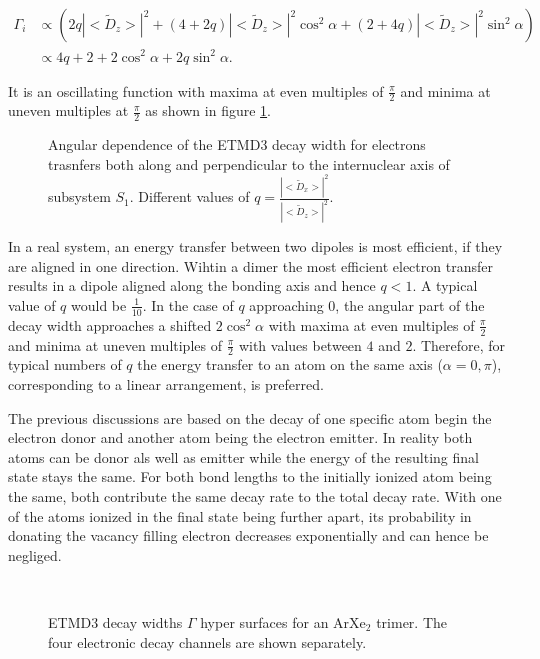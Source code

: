 \begin{align}
 \Gamma_i &\propto \left( 2q |<\tilde{D}_{z}>|^2 +
                  (4+2q)|<\tilde{D}_{z}>|^2 \cos^2\alpha +
                  (2+4q)|<\tilde{D}_{z}>|^2 \sin^2\alpha \right) \\
          &\propto 4q + 2 + 2 \cos^2\alpha + 2q \sin^2\alpha .
\end{align}

It is an oscillating function with maxima at even multiples of $\frac \pi 2$
and minima at uneven multiples at $\frac \pi 2$ as shown in figure \ref{figure:etmd_angle}.

\begin{figure}[h]
 \centering
 
 \caption{Angular dependence of the \ac{ETMD}3 decay width for electrons trasnfers
          both along and perpendicular to the internuclear axis of subsystem $S_1$.
          Different values of $q=\frac{|<\tilde{D}_x>|^2}{|<\tilde{D}_z>|^2}$.}
 \label{figure:etmd_angle}
\end{figure}

In a real system, an energy transfer between
two dipoles is most efficient, if they are aligned in one direction.
Wihtin a dimer the most efficient electron transfer results in a
dipole aligned along the bonding axis and hence $q<1$. A typical
value of $q$ would be $\frac 1{10}$. In the 
case of $q$ approaching 0, the angular part of
the decay width
approaches a shifted $2\cos^2 \alpha$ with maxima at even multiples of $\frac \pi2$
and minima at uneven multiples of $\frac \pi2$ with values between
$4$ and $2$.
Therefore, for typical numbers of $q$ the energy transfer
to an atom on the same axis ($\alpha = 0,\pi$), corresponding
to a linear arrangement, is preferred.

The previous discussions are based on the decay of one specific atom
begin the electron donor and another atom being the electron emitter.
In reality both atoms can be donor als well as emitter while the energy
of the resulting final state stays the same. For both bond lengths to the
initially ionized atom being the same, both contribute the same decay rate
to the total decay rate. With one of the atoms ionized in the final state
being further apart, its probability in donating the vacancy filling electron
decreases exponentially and can hence be negliged.

\begin{figure}[h]
 \centering
 
 \\
 
 
 \caption{\ac{ETMD}3 decay widths $\Gamma$ hyper surfaces for an ArXe$_2$ trimer.
          The four electronic decay channels are shown separately.}
 \label{figure:ArXe2_etmd_geom_gamma}
\end{figure}

